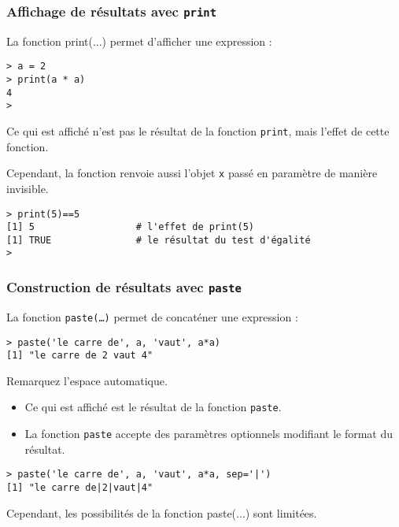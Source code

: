 \documentclass[10pt]{beamer}
\begin{document}
\begin{frame}[fragile]
  \frametitle{Affichage de résultats avec \texttt{print}}
  La fonction print(...) permet d'afficher une expression :
  \begin{lstlisting}
> a = 2
> print(a * a)
4
>
\end{lstlisting}

Ce qui est affiché n'est pas le résultat de la fonction \texttt{print}, mais l'effet de cette fonction.

Cependant, la fonction renvoie aussi l'objet \texttt{x} passé en paramètre de manière invisible.
\begin{lstlisting}
> print(5)==5
[1] 5                  # l'effet de print(5)
[1] TRUE               # le résultat du test d'égalité
>  
\end{lstlisting}
\end{frame}


\begin{frame}[fragile]
\frametitle{Construction de résultats avec \texttt{paste}}
La fonction \texttt{paste(\dots)} permet de concaténer une expression :
\begin{lstlisting}
> paste('le carre de', a, 'vaut', a*a)
[1] "le carre de 2 vaut 4"  
\end{lstlisting}
Remarquez l'espace automatique.

\begin{itemize}
\item Ce qui est affiché est le \alert{résultat} de la fonction \texttt{paste}.
\item La fonction \texttt{paste} accepte des paramètres optionnels modifiant le format du résultat.
\end{itemize}
\begin{lstlisting}
> paste('le carre de', a, 'vaut', a*a, sep='|')
[1] "le carre de|2|vaut|4"
\end{lstlisting}
Cependant, les possibilités de la fonction paste(...) sont limitées.
  
\end{frame}
\end{document}
